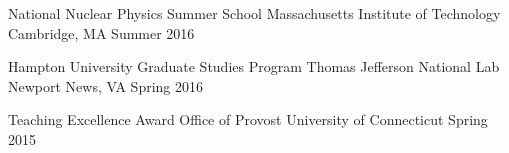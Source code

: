 

\begin{cvhonors}


  \cvhonor
    {National Nuclear Physics Summer School} %
    {Massachusetts Institute of Technology} %
    {Cambridge, MA} %
    {Summer 2016} %

  \cvhonor
    {Hampton University Graduate Studies Program} %
    {Thomas Jefferson National Lab} %
    {Newport News, VA} %
    {Spring 2016} %

\cvhonor
    {Teaching Excellence Award} %
    {Office of Provost} %
    {University of Connecticut} %
    {Spring 2015} %



\end{cvhonors}

